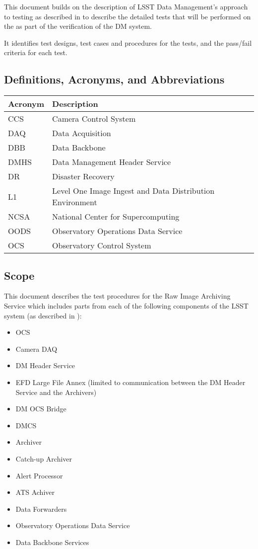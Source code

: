 \documentclass[DM,lsstdraft,STS,toc]{lsstdoc}
\begin{document}
This document builds on the description of LSST Data Management's
approach to testing as described in  to describe
the detailed tests that will be performed on the \product{} as part
of the verification of the DM system.


It identifies test designs, test cases and procedures for the tests,
and the pass/fail criteria for each test.

\subsection{Definitions, Acronyms, and Abbreviations \label{sec:acronyms}}
\addtocounter{table}{-1}
\begin{longtable}{|l|p{}|}\hline
\textbf{Acronym} & \textbf{Description} \\\hline
CCS&Camera Control System \\\hline
DAQ&Data Acquisition\\\hline
DBB&Data Backbone \\\hline
DMHS&Data Management Header Service \\\hline
DR&Disaster Recovery \\\hline
L1&Level One Image Ingest and Data Distribution Environment \\\hline
NCSA&National Center for Supercomputing \\\hline
OODS&Observatory Operations Data Service \\\hline
OCS&Observatory Control System \\\hline
\end{longtable}


\subsection{Scope}
\label{sec:scope}


This document describes the test procedures for the Raw Image Archiving Service
which includes parts from each of the following components of the LSST system
(as described in ):


\begin{itemize}

\item{OCS}
\item{Camera DAQ}
\item{DM Header Service}
\item{EFD Large File Annex (limited to communication between the DM Header Service and the Archivers)}
\item{DM OCS Bridge}
\item{DMCS}
\item{Archiver}
\item{Catch-up Archiver}
\item{Alert Processor}
\item{ATS Achiver}
\item{Data Forwarders}
\item{Observatory Operations Data Service}
\item{Data Backbone Services}


\end{itemize}
\end{document}
